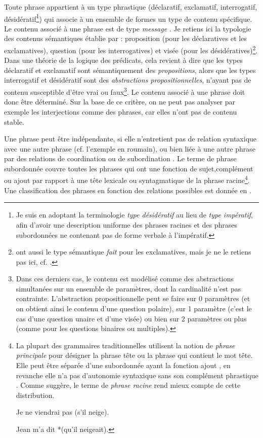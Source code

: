 Toute phrase appartient à un type phrastique (déclaratif, exclamatif, interrogatif, désidératif\footnote{Je suis \citet{MarandinToAppear} en adoptant la terminologie \textit{type désidératif} au lieu de \textit{type impératif}, afin d’avoir une description uniforme des phrases racines et des phrases subordonnées ne contenant pas de forme verbale à l’impératif.}) qui associe à un ensemble de formes un type de contenu spécifique. Le contenu associé à une phrase est de type \textit{message} \citep{GinzburgEtAl2000}. Je retiens ici la typologie des contenus sémantiques établie par \citet{Marandin2008} : proposition (pour les déclaratives et les exclamatives), question (pour les interrogatives) et visée (pour les désidératives)\footnote{\citet{GinzburgEtAl2000} ont aussi le type sémantique \textit{fait} pour les exclamatives, mais je ne le retiens pas ici, cf. \citet{Marandin2008}.}. Dans une théorie de la logique des prédicats, cela revient à dire que les types déclaratif et exclamatif sont sémantiquement des \textit{propositions}, alors que les types interrogatif et désidératif sont des \textit{abstractions propositionnelles}, n’ayant pas de contenu susceptible d’être vrai ou faux\footnote{Dans ces derniers cas, le contenu est modélisé comme des abstractions simultanées sur un ensemble de paramètres, dont la cardinalité n’est pas contrainte. L’abstraction propositionnelle peut se faire sur 0 paramètres (et on obtient ainsi le contenu d’une question polaire), sur 1 paramètre (c’est le cas d’une question unaire et d’une visée) ou bien sur 2 paramètres ou plus (comme pour les questions binaires ou multiples).}. Le contenu associé à une phrase doit donc être déterminé. Sur la base de ce critère, on ne peut pas analyser par exemple les interjections comme des phrases, car elles n’ont pas de contenu stable. 

Une phrase peut être indépendante, si elle n’entretient pas de relation syntaxique avec une autre phrase (cf. l’exemple  en roumain), ou bien liée à une autre phrase par des relations de coordination  ou de subordination . Le terme de phrase subordonnée couvre toutes les phrases qui ont une fonction de sujet,\largerpage[2] complément ou ajout par rapport à une tête lexicale ou syntagmatique de la phrase racine\footnote{La plupart des grammaires traditionnelles utilisent la notion de \textit{phrase principale} pour désigner la phrase tête ou la phrase qui contient le mot tête. Elle peut être séparée d’une subordonnée ayant la fonction ajout , en revanche elle n’a pas d’autonomie syntaxique sans son complément phrastique . Comme \citet{AbeilleToAppear} suggère, le terme de \textit{phrase racine} rend mieux compte de cette distribution.

\ea 
Je ne viendrai pas (s’il neige).\label{ch1:foot11:exi}
\z

\ea 
Jean m’a dit *(qu’il neigeait).\label{ch1:foot11:exii}
\z

}. Une classification des phrases en fonction des relations possibles est donnée en .


